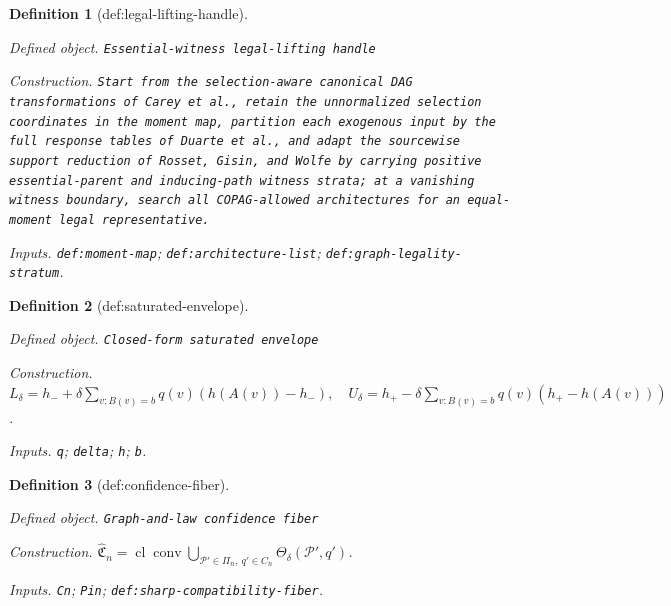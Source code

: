 \documentclass{article}
\newtheorem{definition}{Definition}
\begin{document}
\begin{definition}[def:legal-lifting-handle]\label{def:legal-lifting-handle}
\par\smallskip\noindent\emph{Defined object.} \texttt{Essential-\allowbreak{}witness legal-\allowbreak{}lifting handle}
\par\smallskip\noindent\emph{Construction.} \texttt{Start from the selection-\allowbreak{}aware canonical DAG transformations of Carey et al.,\allowbreak{} retain the unnormalized selection coordinates in the moment map,\allowbreak{} partition each exogenous input by the full response tables of Duarte et al.,\allowbreak{} and adapt the sourcewise support reduction of Rosset,\allowbreak{} Gisin,\allowbreak{} and Wolfe by carrying positive essential-\allowbreak{}parent and inducing-\allowbreak{}path witness strata;\allowbreak{} at a vanishing witness boundary,\allowbreak{} search all COPAG-\allowbreak{}allowed architectures for an equal-\allowbreak{}moment legal representative.}
\par\smallskip\noindent\emph{Inputs.} \texttt{def:\allowbreak{}moment-\allowbreak{}map}; \texttt{def:\allowbreak{}architecture-\allowbreak{}list}; \texttt{def:\allowbreak{}graph-\allowbreak{}legality-\allowbreak{}stratum}.
\end{definition}

\begin{definition}[def:saturated-envelope]\label{def:saturated-envelope}
\par\smallskip\noindent\emph{Defined object.} \texttt{Closed-\allowbreak{}form saturated envelope}
\par\smallskip\noindent\emph{Construction.} \(L_\delta=h_-+\delta\sum_{v:B(v)=b}q(v)(h(A(v))-h_-),\quad U_\delta=h_+-\delta\sum_{v:B(v)=b}q(v)(h_+-h(A(v)))\).
\par\smallskip\noindent\emph{Inputs.} \texttt{q}; \texttt{delta}; \texttt{h}; \texttt{b}.
\end{definition}

\begin{definition}[def:confidence-fiber]\label{def:confidence-fiber}
\par\smallskip\noindent\emph{Defined object.} \texttt{Graph-\allowbreak{}and-\allowbreak{}law confidence fiber}
\par\smallskip\noindent\emph{Construction.} \(\widehat{\mathfrak C}_n=\operatorname{cl}\operatorname{conv}\bigcup_{\mathcal P'\in\Pi_n,\ q'\in C_n}\Theta_\delta(\mathcal P',q')\).
\par\smallskip\noindent\emph{Inputs.} \texttt{Cn}; \texttt{Pin}; \texttt{def:\allowbreak{}sharp-\allowbreak{}compatibility-\allowbreak{}fiber}.
\end{definition}
\end{document}
